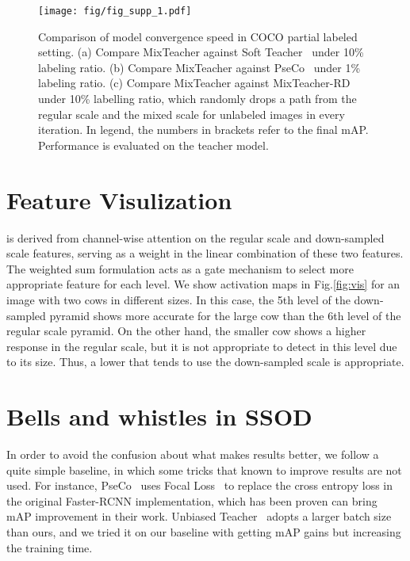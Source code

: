 \documentclass[10pt,twocolumn,letterpaper]{article}
\begin{document}
\begin{figure*}[t]
	\centering
\vspace{0em}
	\texttt{[image: fig/fig\_supp\_1.pdf]}
	\caption{Comparison of model convergence speed in COCO partial labeled setting. (a) Compare MixTeacher against Soft Teacher~\cite{softTeacher} under 10\% labeling ratio. (b) Compare MixTeacher against PseCo~\cite{pseco} under 1\% labeling ratio. (c) Compare MixTeacher against MixTeacher-RD under 10\% labelling ratio, which randomly drops a path from the regular scale and the mixed scale for unlabeled images in every iteration. In legend, the numbers in brackets refer to the final mAP. Performance is evaluated on the teacher model.} 
	\label{fig:train_eff}
\end{figure*}



\section{Feature Visulization}
  is derived from channel-wise attention on the regular scale and down-sampled scale features, serving as a weight in the linear combination of these two features. The weighted sum formulation acts as a gate mechanism to select more appropriate feature for each level. We show activation maps in Fig.\ref{fig:vis} for an image with two cows in different sizes. In this case, the 5th level of the down-sampled pyramid shows more accurate for the large cow than the 6th level of the regular scale pyramid. On the other hand, the smaller cow shows a higher response in the regular scale, but it is not appropriate to detect in this level due to its size. Thus, a lower  that tends to use the down-sampled scale is appropriate.

\section{Bells and whistles in SSOD}
In order to avoid the confusion about what makes results better, we follow a quite simple baseline, in which some tricks that known to improve results are not used. For instance, PseCo~\cite{pseco} uses Focal Loss~\cite{focal} to replace the cross entropy loss in the original Faster-RCNN implementation, which has been proven can bring  mAP improvement in their work. Unbiased Teacher~\cite{unbiasedTeacher} adopts a larger batch size than ours, and we tried it on our baseline with getting  mAP gains but increasing the training time. 
\end{document}
